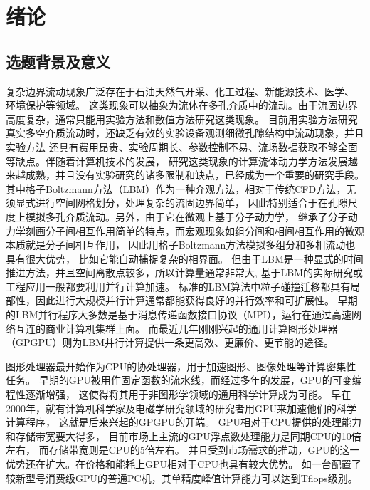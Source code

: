 \chapter{绪论}


\section{选题背景及意义}
复杂边界流动现象广泛存在于石油天然气开采、化工过程、新能源技术、医学、 环境保护等领域。
这类现象可以抽象为流体在多孔介质中的流动。由于流固边界高度复杂，通常只能用实验方法和数值方法研究这类现象。
目前用实验方法研究真实多空介质流动时，还缺乏有效的实验设备观测细微孔隙结构中流动现象，并且实验方法
还具有费用昂贵、实验周期长、参数控制不易、流场数据获取不够全面等缺点。伴随着计算机技术的发展，
研究这类现象的计算流体动力学方法发展越来越成熟，并且没有实验研究的诸多限制和缺点，已经成为一个重要的研究手段。
其中格子Boltzmann方法（LBM）作为一种介观方法，相对于传统CFD方法，无须显式进行空间网格划分，处理复杂的流固边界简单，
因此特别适合于在孔隙尺度上模拟多孔介质流动。另外，由于它在微观上基于分子动力学，
继承了分子动力学刻画分子间相互作用简单的特点，而宏观现象如组分间和相间相互作用的微观本质就是分子间相互作用，
因此用格子Boltzmann方法模拟多组分和多相流动也具有很大优势， 比如它能自动捕捉复杂的相界面。
但由于LBM是一种显式的时间推进方法，并且空间离散点较多，所以计算量通常非常大,
基于LBM的实际研究或工程应用一般都要利用并行计算加速。
标准的LBM算法中粒子碰撞迁移都具有局部性，因此进行大规模并行计算通常都能获得良好的并行效率和可扩展性。
早期的LBM并行程序大多数是基于消息传递函数接口协议（MPI），运行在通过高速网络互连的商业计算机集群上面。
而最近几年刚刚兴起的通用计算图形处理器（GPGPU）则为LBM并行计算提供一条更高效、更廉价、更节能的途径。

图形处理器最开始作为CPU的协处理器，用于加速图形、图像处理等计算密集性任务。
早期的GPU被用作固定函数的流水线，而经过多年的发展，GPU的可变编程性逐渐增强，
这使得将其用于非图形学领域的通用科学计算成为可能。
早在2000年，就有计算机科学家及电磁学研究领域的研究者用GPU来加速他们的科学计算程序，
这就是后来兴起的GPGPU的开端。
GPU相对于CPU提供的处理能力和存储带宽要大得多，
目前市场上主流的GPU浮点数处理能力是同期CPU的10倍左右， 而存储带宽则是CPU的5倍左右。
并且受到市场需求的推动，GPU的这一优势还在扩大。在价格和能耗上GPU相对于CPU也具有较大优势。
如一台配置了较新型号消费级GPU的普通PC机，其单精度峰值计算能力可以达到Tflops级别。

